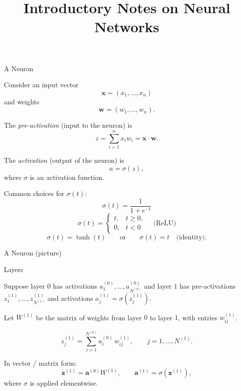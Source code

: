 \documentclass[aspectratio=169]{beamer}
\title{Introductory Notes on Neural Networks}
\author{}
\date{}
\begin{document}
\begin{frame}
  \titlepage
\end{frame}

\begin{frame}{A Neuron}

Consider an input vector
\[
  \bm{x} = (x_1,\dots,x_n)
\]
and weights
\[
  \bm{w} = (w_1,\dots,w_n).
\]

\medskip

The \emph{pre-activation} (input to the neuron) is
\[
  z = \sum_{i=1}^n x_i w_i = \bm{x}\cdot\bm{w}.
\]

The \emph{activation} (output of the neuron) is
\[
  a = \sigma(z),
\]
where $\sigma$ is an activation function.

\medskip

Common choices for $\sigma(t)$:
\[
  \sigma(t) = \frac{1}{1+e^{-t}}
\]
\[
  \sigma(t) = 
    \begin{cases}
      t, & t \ge 0,\\
      0, & t < 0
    \end{cases}
    \quad\text{(ReLU)}
\]
\[
  \sigma(t) = \tanh(t)
  \qquad\text{or}\qquad
  \sigma(t) = t \quad\text{(identity).}
\]

\end{frame}

\begin{frame}{A Neuron (picture)}

\centering
{}

\end{frame}

\begin{frame}{Layers}

Suppose layer $0$ has activations $a^{(0)}_1,\dots,a^{(0)}_{N^{(0)}}$ 
and layer $1$ has pre-activations $z^{(1)}_1,\dots,z^{(1)}_{N^{(1)}}$ and
activations $a^{(1)}_j = \sigma(z^{(1)}_j)$.

\medskip

Let $W^{(1)}$ be the matrix of weights from layer $0$ to layer $1$,
with entries $w^{(1)}_{ij}$.

\[
  z^{(1)}_j = \sum_{i=1}^{N^{(0)}} a^{(0)}_i\,w^{(1)}_{ij},
  \qquad j=1,\dots,N^{(1)}.
\]

In vector / matrix form:
\[
  \bm{z}^{(1)} = \bm{a}^{(0)} W^{(1)}, \qquad
  \bm{a}^{(1)} = \sigma\!\left(\bm{z}^{(1)}\right),
\]
where $\sigma$ is applied elementwise.

\end{frame}
\end{document}
